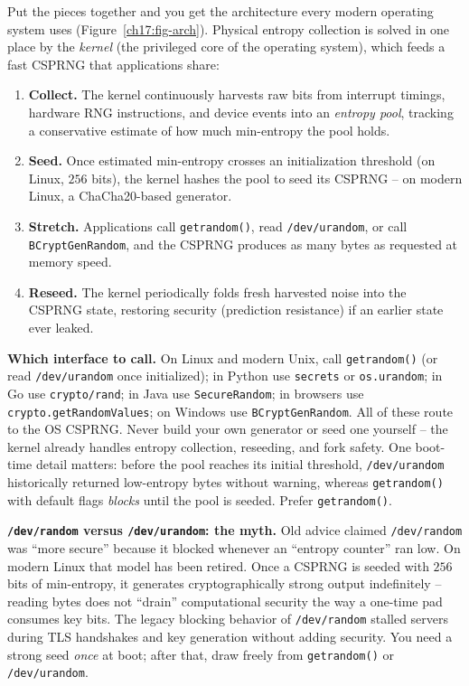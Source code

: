 Put the pieces together and you get the architecture every modern operating system uses (Figure~\ref{ch17:fig-arch}). Physical entropy collection is solved in one place by the \emph{kernel} (the privileged core of the operating system), which feeds a fast CSPRNG that applications share:

\begin{enumerate}
  \item \textbf{Collect.} The kernel continuously harvests raw bits from interrupt timings, hardware RNG instructions, and device events into an \emph{entropy pool}, tracking a conservative estimate of how much min-entropy the pool holds.
  \item \textbf{Seed.} Once estimated min-entropy crosses an initialization threshold (on Linux, $256$ bits), the kernel hashes the pool to seed its CSPRNG -- on modern Linux, a ChaCha20-based generator.
  \item \textbf{Stretch.} Applications call \texttt{getrandom()}, read \texttt{/dev/urandom}, or call \texttt{BCryptGenRandom}, and the CSPRNG produces as many bytes as requested at memory speed.
  \item \textbf{Reseed.} The kernel periodically folds fresh harvested noise into the CSPRNG state, restoring security (prediction resistance) if an earlier state ever leaked.
\end{enumerate}

\begin{applicationbox}
\textbf{Which interface to call.} On Linux and modern Unix, call \texttt{getrandom()} (or read \texttt{/dev/urandom} once initialized); in Python use \texttt{secrets} or \texttt{os.urandom}; in Go use \texttt{crypto/rand}; in Java use \texttt{SecureRandom}; in browsers use \texttt{crypto.getRandomValues}; on Windows use \texttt{BCryptGenRandom}. All of these route to the OS CSPRNG. Never build your own generator or seed one yourself -- the kernel already handles entropy collection, reseeding, and fork safety. One boot-time detail matters: before the pool reaches its initial threshold, \texttt{/dev/urandom} historically returned low-entropy bytes without warning, whereas \texttt{getrandom()} with default flags \emph{blocks} until the pool is seeded. Prefer \texttt{getrandom()}.
\end{applicationbox}

\begin{trapbox}
\textbf{\texttt{/dev/random} versus \texttt{/dev/urandom}: the myth.} Old advice claimed \texttt{/dev/random} was ``more secure'' because it blocked whenever an ``entropy counter'' ran low. On modern Linux that model has been retired. Once a CSPRNG is seeded with $256$ bits of min-entropy, it generates cryptographically strong output indefinitely -- reading bytes does not ``drain'' computational security the way a one-time pad consumes key bits. The legacy blocking behavior of \texttt{/dev/random} stalled servers during TLS handshakes and key generation without adding security. You need a strong seed \emph{once} at boot; after that, draw freely from \texttt{getrandom()} or \texttt{/dev/urandom}.
\end{trapbox}

